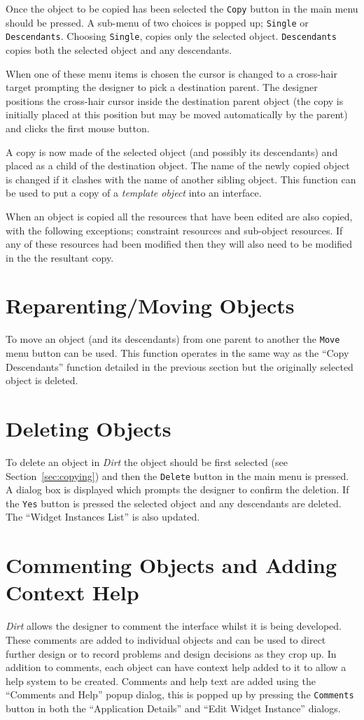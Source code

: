 Once the object to be copied has been selected the {\tt Copy} button in the
main menu should be pressed.  A sub-menu of two choices is popped up;
{\tt Single} or {\tt Descendants}.  Choosing {\tt Single}, copies only the
selected object. {\tt Descendants} copies both the selected object and any
descendants.

When one of these menu items is chosen the cursor is changed to a cross-hair
target prompting the designer to pick a destination parent.  The designer 
positions the cross-hair cursor inside the destination parent object
(the copy is
initially placed at this position but may be moved automatically by the
parent) and clicks the first mouse button.

A copy is now made of the selected object (and possibly its descendants) and
placed as a child of the destination object.  The name of the newly copied
object is changed if it clashes with the name of another sibling object.
This function can be used to put a copy of a {\em template object}
into an interface.

When an object is copied all the resources that have been edited are also
copied, with the following exceptions; constraint resources and sub-object
resources. If any of these resources had been modified then they
will also need to be modified in the the resultant copy.

\section{Reparenting/Moving Objects}
\label{sec:reparenting}
To move an object (and its descendants) from one parent to another the
{\tt Move} menu button can be used.  This function operates in the same way as
the ``Copy Descendants'' function detailed in the previous section but the
originally selected object is deleted.

\section{Deleting Objects}
\label{sec:deleting}
To delete an object in {\em Dirt} the object should be first selected
(see Section~\ref{sec:copying}) and then the {\tt Delete} button in the main
menu is pressed.
A dialog box is displayed which prompts the designer to confirm
the deletion.  If the {\tt Yes} button is pressed the selected object and any
descendants are deleted.  The ``Widget Instances List'' is also updated.

\section{Commenting Objects and Adding Context Help}
\label{sec:commenting}
{\em Dirt} allows the designer to comment the interface whilst it is being
developed.  These comments are added to individual objects and can be used to
direct further design or to record problems and design decisions as they crop
up.  In addition to comments, each object can have context help added to it
to allow a help system to be created.  Comments and help text are added
using the ``Comments and Help'' popup dialog, this is popped up by pressing
the {\tt Comments} button in both the ``Application Details'' and
``Edit Widget Instance'' dialogs.

